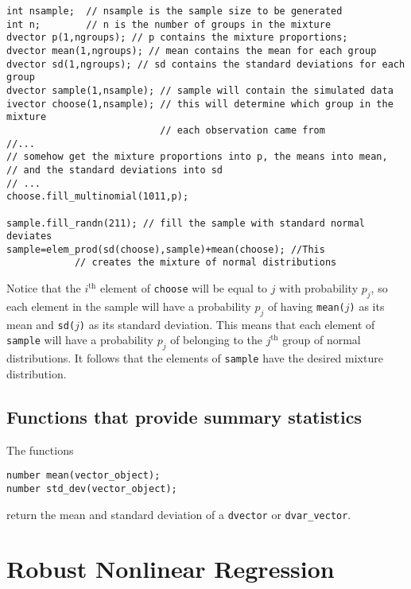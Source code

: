 \documentclass{admbmanual}
\begin{document}
\begin{lstlisting}
int nsample;  // nsample is the sample size to be generated
int n;        // n is the number of groups in the mixture
dvector p(1,ngroups); // p contains the mixture proportions;
dvector mean(1,ngroups); // mean contains the mean for each group 
dvector sd(1,ngroups); // sd contains the standard deviations for each group 
dvector sample(1,nsample); // sample will contain the simulated data
ivector choose(1,nsample); // this will determine which group in the mixture
                           // each observation came from
//...
// somehow get the mixture proportions into p, the means into mean,
// and the standard deviations into sd
// ...
choose.fill_multinomial(1011,p); 

sample.fill_randn(211); // fill the sample with standard normal deviates
sample=elem_prod(sd(choose),sample)+mean(choose); //This
            // creates the mixture of normal distributions
\end{lstlisting}

Notice that the $i^\textrm{th}$ element of \texttt{choose} will be equal to $j$ with
probability $p_j$, so each element in the sample will have
a probability $p_j$ of having \texttt{mean($j$)} as its mean and \texttt{sd($j$)} as its standard
deviation. This means that each element of \texttt{sample} will
have a probability $p_j$ of belonging to the $j^\textrm{th}$ group of normal
distributions. It follows that the elements of \texttt{sample} have
the desired mixture distribution.


\section{Functions that provide summary statistics}

The functions
\begin{lstlisting}
number mean(vector_object);
number std_dev(vector_object);
\end{lstlisting}
\noindent return the mean and standard deviation of a \texttt{dvector} or 
\texttt{dvar\_vector}.




\chapter{Robust Nonlinear Regression}
\label{ch:robust-nonlinear-regression}
\end{document}
